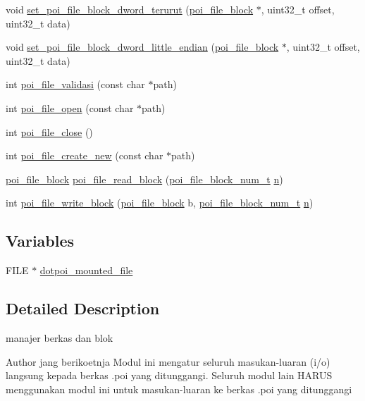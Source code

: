 \begin{DoxyCompactItemize}
\item 
void \hyperlink{file-manager_8h_a0dc02398a042528d16e54822f1543742}{set\-\_\-poi\-\_\-file\-\_\-block\-\_\-dword\-\_\-terurut} (\hyperlink{structpoi__file__block}{poi\-\_\-file\-\_\-block} $\ast$, uint32\-\_\-t offset, uint32\-\_\-t data)
\item 
void \hyperlink{file-manager_8h_a3e138c2766b909a90fd280bc5e899bfe}{set\-\_\-poi\-\_\-file\-\_\-block\-\_\-dword\-\_\-little\-\_\-endian} (\hyperlink{structpoi__file__block}{poi\-\_\-file\-\_\-block} $\ast$, uint32\-\_\-t offset, uint32\-\_\-t data)
\item 
int \hyperlink{file-manager_8h_af091ab9b6704b6affa17ea12fd51e628}{poi\-\_\-file\-\_\-validasi} (const char $\ast$path)
\item 
int \hyperlink{file-manager_8h_ac286b940c82432a07288c7a9afdc884a}{poi\-\_\-file\-\_\-open} (const char $\ast$path)
\item 
int \hyperlink{file-manager_8h_a873cfe2d99ac7a57ff0a391d87c825dd}{poi\-\_\-file\-\_\-close} ()
\item 
int \hyperlink{file-manager_8h_a9a8111f4e7948ad43fef393e0e4e3247}{poi\-\_\-file\-\_\-create\-\_\-new} (const char $\ast$path)
\item 
\hyperlink{structpoi__file__block}{poi\-\_\-file\-\_\-block} \hyperlink{file-manager_8h_ac995e99a526073da84cd4fb1dab93a0a}{poi\-\_\-file\-\_\-read\-\_\-block} (\hyperlink{file-manager_8h_aef709af8fc6566dcaf55b656bb9f8881}{poi\-\_\-file\-\_\-block\-\_\-num\-\_\-t} \hyperlink{allocation-table-test_8c_a24010dade8ebab3f87a48022772cd975}{n})
\item 
int \hyperlink{file-manager_8h_aafd8b089a2a7b6c25cec6ec8c9504e5a}{poi\-\_\-file\-\_\-write\-\_\-block} (\hyperlink{structpoi__file__block}{poi\-\_\-file\-\_\-block} b, \hyperlink{file-manager_8h_aef709af8fc6566dcaf55b656bb9f8881}{poi\-\_\-file\-\_\-block\-\_\-num\-\_\-t} \hyperlink{allocation-table-test_8c_a24010dade8ebab3f87a48022772cd975}{n})
\end{DoxyCompactItemize}
\subsection*{Variables}
\begin{DoxyCompactItemize}
\item 
F\-I\-L\-E $\ast$ \hyperlink{file-manager_8h_a45917dedb770baeed00c159332c7e736}{dotpoi\-\_\-mounted\-\_\-file}
\end{DoxyCompactItemize}


\subsection{Detailed Description}
manajer berkas dan blok \begin{DoxyAuthor}{Author}
jang berikoetnja Modul ini mengatur seluruh masukan-\/luaran (i/o) langsung kepada berkas .poi yang ditunggangi. Seluruh modul lain H\-A\-R\-U\-S menggunakan modul ini untuk masukan-\/luaran ke berkas .poi yang ditunggangi 
\end{DoxyAuthor}


